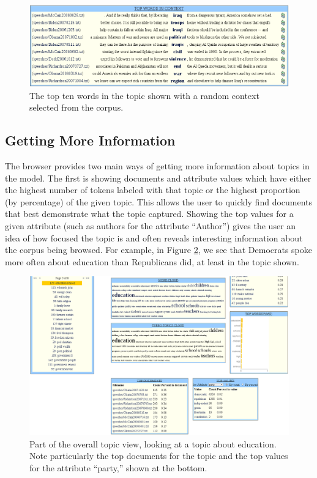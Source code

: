 \documentclass{article}
\begin{document}
\begin{figure}
  \centering
  \includegraphics[width=.8\textwidth]{words_in_context}
  \caption{The top ten words in the topic shown with a random context selected
  from the corpus.}
  \label{fig:context}
\end{figure}

\subsection{Getting More Information}

The browser provides two main ways of getting more information about topics in
the model.  The first is showing documents and attribute values which have
either the highest number of tokens labeled with that topic or the highest
proportion (by percentage) of the given topic.  This allows the user to quickly
find documents that best demonstrate what the topic captured.  Showing the top
values for a given attribute (such as authors for the attribute ``Author'')
gives the user an idea of how focused the topic is and often reveals
interesting information about the corpus being browsed.  For example, in Figure
\ref{fig:top-values}, we see that Democrats spoke more often about education
than Republicans did, at least in the topic shown.

\begin{figure}
  \centering
  \includegraphics[width=\textwidth]{top_values}
  \caption{Part of the overall topic view, looking at a topic about education.
  Note particularly the top documents for the topic and the top values for the
  attribute ``party,'' shown at the bottom.}
  \label{fig:top-values}
\end{figure}
\end{document}
